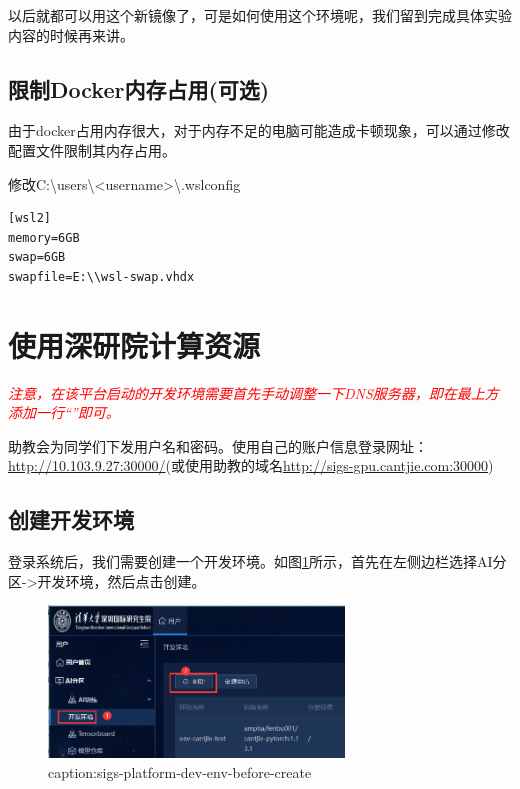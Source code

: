 以后就都可以用这个新镜像了，可是如何使用这个环境呢，我们留到完成具体实验内容的时候再来讲。

\subsection{限制Docker内存占用(可选)}

由于docker占用内存很大，对于内存不足的电脑可能造成卡顿现象，可以通过修改配置文件限制其内存占用。

修改C:\textbackslash users\textbackslash<username>\textbackslash .wslconfig 

\begin{lstlisting}
[wsl2]
memory=6GB
swap=6GB
swapfile=E:\\wsl-swap.vhdx
\end{lstlisting}





\section{使用深研院计算资源}\label{sec:env-setup-sigs-resources}

\textcolor{red}{\emph{注意，在该平台启动的开发环境需要首先手动调整一下DNS服务器，即在最上方添加一行“”即可。}}

助教会为同学们下发用户名和密码。使用自己的账户信息登录网址：\url{http://10.103.9.27:30000/}(或使用助教的域名\url{http://sigs-gpu.cantjie.com:30000})

\subsection{创建开发环境}

登录系统后，我们需要创建一个开发环境。如图\ref{fig:sigs-platform-dev-env-before-create}所示，首先在左侧边栏选择AI分区->开发环境，然后点击创建。

\begin{figure}[htbp]
	\centering
	\includegraphics[width=0.7\textwidth]{figures/sigs-platform-dev-env-before-create.png}
	\caption{caption:sigs-platform-dev-env-before-create}
	\label{fig:sigs-platform-dev-env-before-create}
\end{figure}

